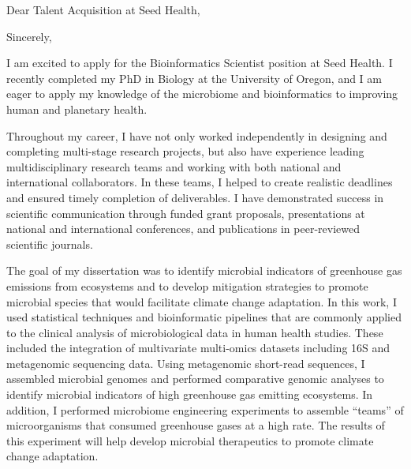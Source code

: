 \documentclass[11pt,letterpaper,sans]{moderncv}        %
\begin{document}

\clearpage
\date{February 25, 2023}
\opening{Dear Talent Acquisition at Seed Health,}
\closing{Sincerely,}
\makelettertitle

I am excited to apply for the Bioinformatics Scientist position at Seed Health.
I recently completed my PhD in Biology at the University of Oregon, and I am
eager to apply my knowledge of the microbiome and bioinformatics to improving
human and planetary health.

Throughout my career, I have not only worked independently in designing and
completing multi-stage research projects, but also have experience leading
multidisciplinary research teams and working with both national and
international collaborators. In these teams, I helped to create realistic
deadlines and ensured timely completion of deliverables. I have demonstrated
success in scientific communication through funded grant proposals,
presentations at national and international conferences, and publications in
peer-reviewed scientific journals. 

The goal of my dissertation was to identify microbial indicators of greenhouse
gas emissions from ecosystems and to develop mitigation strategies to promote
microbial species that would facilitate climate change adaptation. 
In this work, I used statistical techniques and bioinformatic
pipelines that are commonly applied to the clinical analysis of microbiological
data in human health studies. These included the integration of multivariate
multi-omics datasets including 16S and metagenomic sequencing data. Using
metagenomic short-read sequences, I assembled microbial genomes and performed
comparative genomic analyses to identify microbial indicators of high
greenhouse gas emitting ecosystems. In addition, I performed microbiome engineering
experiments to assemble ``teams'' of microorganisms that consumed greenhouse
gases at a high rate. The results of this experiment will help develop
microbial therapeutics to promote climate change adaptation.
\end{document}
